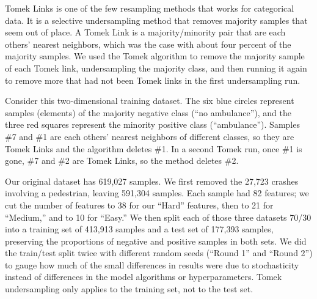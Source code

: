 Tomek Links is one of the few resampling methods that works for categorical data.  It is a selective undersampling method that removes majority samples that seem out of place.  A Tomek Link is a majority/minority pair that are each others' nearest neighbors, which was the case with about four percent of the majority samples.  We used the Tomek algorithm to remove the majority sample of each Tomek link, undersampling the majority class, and then running it again to remove more that had not been Tomek links in the first undersampling run.   


Consider this two-dimensional training dataset.  The six blue circles represent samples (elements) of the majority negative class (``no ambulance''), and the three red squares represent the minority positive class (``ambulance'').  Samples \#7 and \#1 are each others' nearest neighbors of different classes, so they are Tomek Links and the algorithm deletes \#1.  In a second Tomek run, once \#1 is gone, \#7 and \#2 are Tomek Links, so the method deletes \#2.  


\begin{center}
\end{center}



Our original dataset has 619,027 samples.  We first removed the 27,723 crashes involving a pedestrian, leaving 591,304 samples.  Each sample had 82 features; we cut the number of features to 38 for our ``Hard'' features, then to 21 for ``Medium,'' and to 10 for ``Easy.''  We then split each of those three datasets 70/30 into a training set of 413,913 samples and a test set of 177,393 samples, preserving the proportions of negative and positive samples in both sets.  We did the train/test split twice with different random seeds (``Round 1'' and ``Round 2'') to gauge how much of the small differences in results were due to stochasticity instead of differences in the model algorithms or hyperparameters.  Tomek undersampling only applies to the training set, not to the test set.  

